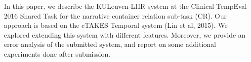 In this paper, we describe the KULeuven-LIIR system at the Clinical TempEval 2016 Shared Task for the narrative container relation sub-task (CR). Our approach is based on the cTAKES Temporal system (Lin et al, 2015). We explored extending this system with different features. Moreover, we provide an error analysis of the submitted system, and report on some additional experiments done after submission.
